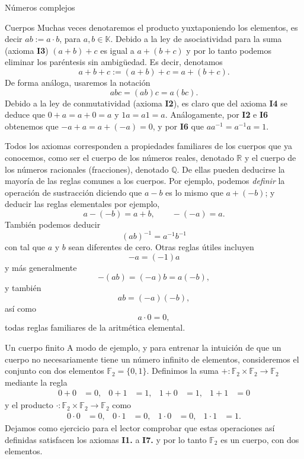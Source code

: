 \documentclass[a4paper,12pt,twoside,spanish,reqno]{amsbook}
\theoremstyle{definition}
\theoremstyle{remark}
\newcommand{\Q}{\mathbb Q}
\newcommand{\R}{\mathbb R}
\newcommand{\K}{\mathbb K}
\newcommand{\F}{\mathbb F}
\begin{document}
\begin{chapter}{Números complejos}
\begin{section}{Cuerpos}
		Muchas veces denotaremos el producto yuxtaponiendo los elementos,  es decir $ab := a\cdot b$, para $a,b \in \K$. Debido a la ley de asociatividad para la suma (axioma {\bf I3}) $(a+b)+c$ es igual a $a+(b+c)$ y por lo tanto podemos eliminar los paréntesis sin ambigüedad. Es decir, denotamos
		$$
		a+b+c := (a+b)+c = a+(b+c).
		$$
		De forma análoga, usaremos la notación
		$$
		abc = (ab)c = a(bc).
		$$
		Debido a la ley de conmutatividad (axioma {\bf I2}), es claro que del axioma {\bf I4} se deduce que  $0+a=a+0=a$ y $1a = a1=a$. Análogamente,  por  {\bf I2} e  {\bf I6} obtenemos que  $-a+a =   
		a+(-a)=0$, y por {\bf I6} que  $a a^{-1} = a^{-1}a=1$.
		
		
		
		Todos los axiomas corresponden a propiedades familiares de los cuerpos que ya conocemos,  como ser el cuerpo de los números reales, denotado $\R$ y el cuerpo de los números racionales (fracciones),  denotado $\Q$. De ellas pueden deducirse la mayoría de las reglas comunes a los cuerpos. Por ejemplo, podemos {\it definir} la operación de sustracción diciendo que $a-b$ es lo mismo que $a+(-b)$; y deducir las reglas elementales por ejemplo,
		\begin{equation*}
		a-(-b) = a+b, \qquad -(-a) = a.
		\end{equation*}	
		También podemos deducir
		\begin{equation*}
		(ab)^{-1} = a^{-1}b^{-1}
		\end{equation*}
		con tal que $a$ y $b$ sean diferentes de cero. Otras reglas útiles incluyen	
		\begin{equation*}
		-a = (-1)a 
		\end{equation*}					
		y más generalmente
		\begin{equation*}
		- (ab) = (-a) b = a  (-b),
		\end{equation*}	
		y  también 
		\begin{equation*}
		ab = (-a) (-b),
		\end{equation*}
		así como
		\begin{equation*}
		a\cdot 0 = 0,
		\end{equation*}
		todas reglas familiares de la aritmética elemental.
	\end{section}
	
	
	\begin{subsection}{Un cuerpo finito}
		A modo de ejemplo, y para entrenar la intuición de que un cuerpo no necesariamente tiene un número infinito de elementos, consideremos el conjunto con dos elementos $\F_2=\{0,1\}$. Definimos la suma $+\colon\F_2\times \F_2\to \F_2$ mediante la regla
		\begin{align*}
		0+0&=0, & 0+1&=1, & 1+0&=1, & 1+1&=0
		\end{align*}
		y el producto $\cdot \colon\F_2\times \F_2\to \F_2$ como 
		\begin{align*}
		0\cdot 0&=0, & 0\cdot 1&=0, & 1\cdot 0&=0, & 1\cdot 1&=1.
		\end{align*}
		Dejamos como ejercicio para el lector comprobar que estas operaciones así definidas satisfacen los axiomas {\bf I1.} a {\bf I7.} y por lo tanto $\F_2$ es un cuerpo, con dos elementos.
		

\end{subsection}
\end{chapter}
\end{document}
